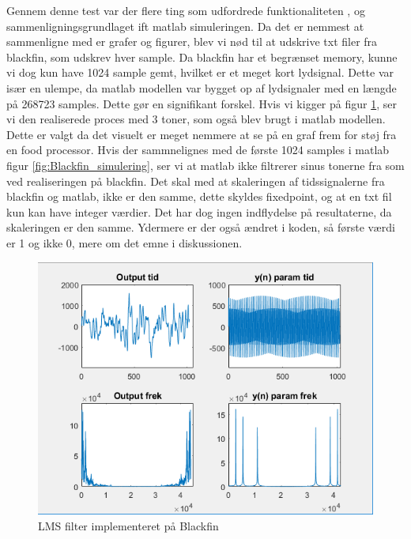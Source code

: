 Gennem denne test var der flere ting som udfordrede funktionaliteten , og sammenligningsgrundlaget ift matlab simuleringen. 
Da det er nemmest at sammenligne med er grafer og figurer, blev vi nød til at udskrive txt filer fra blackfin, som udskrev hver sample. Da blackfin har et begrænset memory, kunne vi dog kun have 1024 sample gemt, hvilket er et meget kort lydsignal. Dette var især en ulempe, da matlab modellen var bygget op af lydsignaler med en længde på 268723 samples. Dette gør en signifikant forskel. 
Hvis vi kigger på figur \ref{fig:Blackfin}, ser vi den realiserede proces med 3 toner, som også blev brugt i matlab modellen. Dette er valgt da det visuelt er meget nemmere at se på en graf frem for støj fra en food processor.
Hvis der sammnelignes med de første 1024 samples i matlab figur \ref{fig:Blackfin_simulering}, ser vi at matlab ikke filtrerer sinus tonerne fra som ved realiseringen på blackfin. Det skal med at skaleringen af tidssignalerne fra blackfin og matlab, ikke er den samme, dette skyldes fixedpoint, og at en txt fil kun kan have integer værdier. Det har dog ingen indflydelse på resultaterne, da skaleringen er den samme. Ydermere er der også ændret i koden, så første værdi er 1 og ikke 0, mere om det emne i diskussionen. 
\begin{figure}[H]
	\centering
	\includegraphics[width = 400pt]{Img/Blackfin}
	\caption{LMS filter implementeret på Blackfin}
	\label{fig:Blackfin}
\end{figure}

